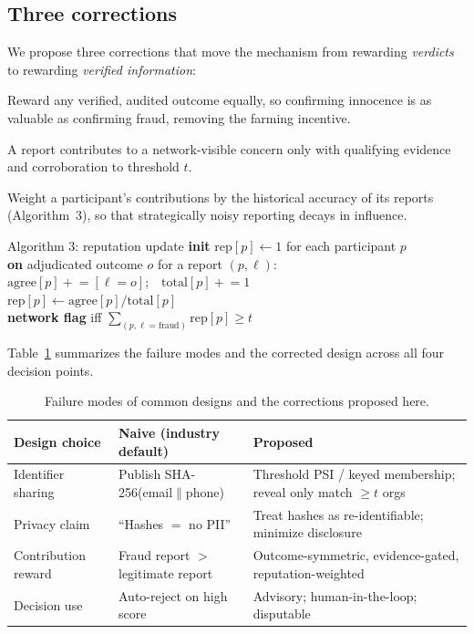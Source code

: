 \documentclass[11pt]{article}
\begin{document}
\subsection{Three corrections}
We propose three corrections that move the mechanism from rewarding
\emph{verdicts} to rewarding \emph{verified information}:
\begin{description}[leftmargin=1.2em,itemsep=2pt]
  \item[(i) Outcome symmetry.] Reward any verified, audited outcome equally, so
  confirming innocence is as valuable as confirming fraud, removing the farming
  incentive.
  \item[(ii) Evidence gating.] A report contributes to a network-visible concern
  only with qualifying evidence and corroboration to threshold $t$.
  \item[(iii) Reputation weighting.] Weight a participant's contributions by the
  historical accuracy of its reports (Algorithm~3), so that
  strategically noisy reporting decays in influence.
\end{description}

\begin{algbox}{Algorithm 3: reputation update}
\ttfamily\small
\textbf{init} $\mathrm{rep}[p] \leftarrow 1$ for each participant $p$\\
\textbf{on} adjudicated outcome $o$ for a report $(p,\ell)$:\\
\hspace*{1.2em}$\mathrm{agree}[p] \mathrel{+}= [\ell = o]$;\ \ $\mathrm{total}[p] \mathrel{+}= 1$\\
\hspace*{1.2em}$\mathrm{rep}[p] \leftarrow \mathrm{agree}[p]/\mathrm{total}[p]$\\
\textbf{network flag} iff $\sum_{(p,\ell=\text{fraud})} \mathrm{rep}[p] \ge t$
\end{algbox}

Table~\ref{tab:design} summarizes the failure modes and the corrected design
across all four decision points.

\begin{table}[t]\centering\small
\caption{Failure modes of common designs and the corrections proposed here.}\label{tab:design}
\begin{tabular}{p{2.7cm}p{4.7cm}p{6.4cm}}
\toprule
Design choice & Naive (industry default) & Proposed \\
\midrule
Identifier sharing & Publish SHA-256(email$\|$phone) & Threshold PSI / keyed membership; reveal only match $\ge t$ orgs \\
Privacy claim & ``Hashes $=$ no PII'' & Treat hashes as re-identifiable; minimize disclosure \\
Contribution reward & Fraud report $>$ legitimate report & Outcome-symmetric, evidence-gated, reputation-weighted \\
Decision use & Auto-reject on high score & Advisory; human-in-the-loop; disputable \\
\bottomrule
\end{tabular}
\end{table}
\end{document}
